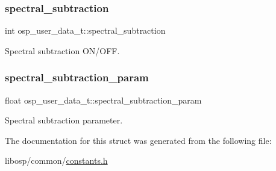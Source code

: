 \subsubsection{\texorpdfstring{spectral\+\_\+subtraction}{spectral\_subtraction}}
{\footnotesize\ttfamily int osp\+\_\+user\+\_\+data\+\_\+t\+::spectral\+\_\+subtraction}



Spectral subtraction O\+N/\+O\+FF. 

\mbox{\label{structosp__user__data__t_a21ab3e8e57f137d0308868f84d09631f}} 
\subsubsection{\texorpdfstring{spectral\+\_\+subtraction\+\_\+param}{spectral\_subtraction\_param}}
{\footnotesize\ttfamily float osp\+\_\+user\+\_\+data\+\_\+t\+::spectral\+\_\+subtraction\+\_\+param}



Spectral subtraction parameter. 



The documentation for this struct was generated from the following file\+:\begin{DoxyCompactItemize}
\item 
libosp/common/\mbox{\hyperlink{constants_8h}{constants.\+h}}\end{DoxyCompactItemize}

